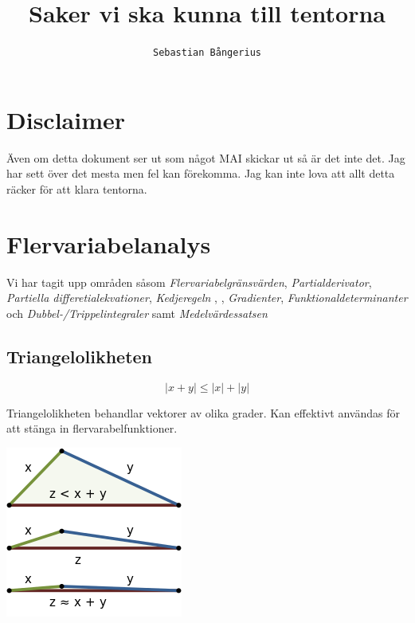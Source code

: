 \documentclass[10pt,a4paper]{article}
\author{
  \texttt{Sebastian Bångerius}
}
\begin{document}

\title{Saker vi ska kunna till tentorna}
\maketitle

\cleardoublepage

\tableofcontents

\clearpage
\section{Disclaimer}
Även om detta dokument ser ut som något MAI skickar ut så är det inte det. Jag har sett över det mesta men fel kan förekomma. Jag kan inte lova att allt detta räcker för att klara tentorna.

\section{Flervariabelanalys}
Vi har tagit upp områden såsom \textit{Flervariabelgränsvärden}, \textit{Partialderivator}, \textit{Partiella differetialekvationer}, \textit{Kedjeregeln} , \textit{}, \textit{Gradienter}, \textit{Funktionaldeterminanter} och \textit{Dubbel-/Trippelintegraler} samt \textit{Medelvärdessatsen}

\subsection{Triangelolikheten}
\begin{equation}
\left|x+y\right|\leq\left|x\right|+\left|y\right|
\end{equation}
\begin{flushleft}
Triangelolikheten behandlar vektorer av olika grader. Kan effektivt användas för att stänga in flervarabelfunktioner.
\end{flushleft}
\begin{center}
\includegraphics[scale=0.5]{triangelolikhet}
\end{center}
\end{document}
